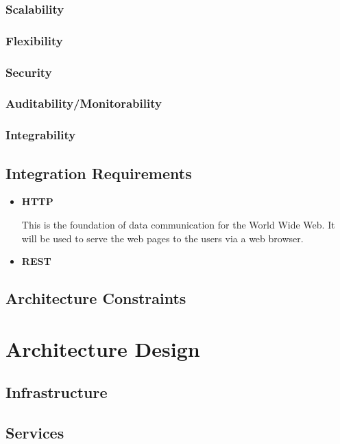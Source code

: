 \documentclass{article}
\begin{document}
\subsubsection{Scalability}

\subsubsection{Flexibility}

\subsubsection{Security}

\subsubsection{Auditability/Monitorability}

\subsubsection{Integrability}

\subsection{Integration Requirements}
\begin{itemize}
	\item \textbf{HTTP}
	
	This is the foundation of data communication for the World Wide Web. It will be used to serve the web pages to the users via a web browser.
	
	\item \textbf{REST}
	
\end{itemize}

\subsection{Architecture Constraints}

\section{Architecture Design}

\subsection{Infrastructure}

\subsection{Services}
\end{document}

